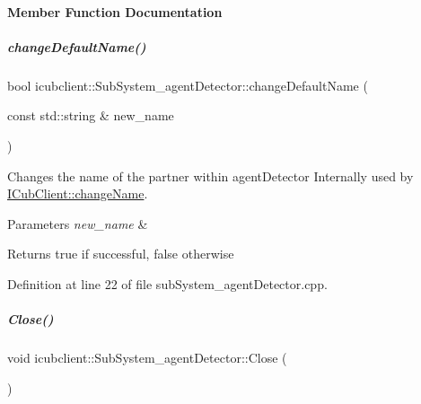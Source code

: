 \paragraph{Member Function Documentation}
\mbox{\label{group__icubclient__subsystems_ad8210611c13b45d3b1ec17f18a10bce8}} 
\subparagraph{\texorpdfstring{change\+Default\+Name()}{changeDefaultName()}}
{\footnotesize\ttfamily bool icubclient\+::\+Sub\+System\+\_\+agent\+Detector\+::change\+Default\+Name (\begin{DoxyParamCaption}\item[{const std\+::string \&}]{new\+\_\+name }\end{DoxyParamCaption})\hspace{0.3cm}{\ttfamily [protected]}}



Changes the name of the partner within agent\+Detector Internally used by \hyperlink{group__icubclient__clients_a860fb1399bafb125c3955110dc17a42e}{I\+Cub\+Client\+::change\+Name}. 


\begin{DoxyParams}{Parameters}
{\em new\+\_\+name} & \\
\hline
\end{DoxyParams}
\begin{DoxyReturn}{Returns}
true if successful, false otherwise 
\end{DoxyReturn}


Definition at line 22 of file sub\+System\+\_\+agent\+Detector.\+cpp.

\mbox{\label{group__icubclient__subsystems_ac36d06ae1d94f17a8eb3581664479127}} 
\subparagraph{\texorpdfstring{Close()}{Close()}}
{\footnotesize\ttfamily void icubclient\+::\+Sub\+System\+\_\+agent\+Detector\+::\+Close (\begin{DoxyParamCaption}{ }\end{DoxyParamCaption})\hspace{0.3cm}{\ttfamily [virtual]}}



